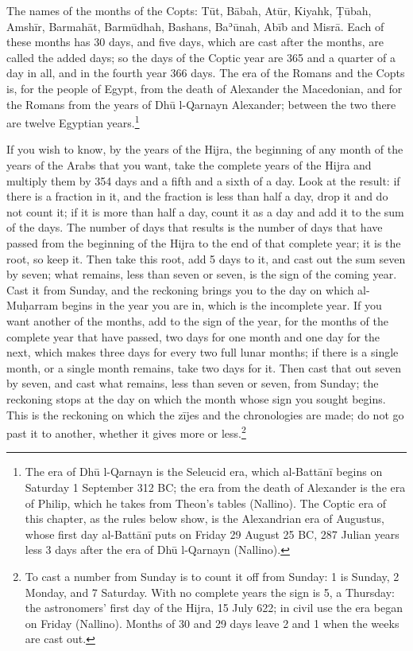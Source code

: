 \documentclass[11pt]{article}
\begin{document}
\par The names of the months of the Copts: Tūt, Bābah, Atūr, Kiyahk, Ṭūbah, Amshīr, Barmahāt, Barmūdhah, Bashans, Baʾūnah, Abīb and Misrā. Each of these months has 30 days, and five days, which are cast after the months, are called the added days; so the days of the Coptic year are 365 and a quarter of a day in all, and in the fourth year 366 days. The era of the Romans and the Copts is, for the people of Egypt, from the death of Alexander the Macedonian, and for the Romans from the years of Dhū l-Qarnayn Alexander; between the two there are twelve Egyptian years.\footnote{The era of Dhū l-Qarnayn is the Seleucid era, which al-Battānī begins on Saturday 1 September 312 BC; the era from the death of Alexander is the era of Philip, which he takes from Theon's tables (Nallino). The Coptic era of this chapter, as the rules below show, is the Alexandrian era of Augustus, whose first day al-Battānī puts on Friday 29 August 25 BC, 287 Julian years less 3 days after the era of Dhū l-Qarnayn (Nallino).}\par
\par If you wish to know, by the years of the Hijra, the beginning of any month of the years of the Arabs that you want, take the complete years of the Hijra and multiply them by 354 days and a fifth and a sixth of a day. Look at the result: if there is a fraction in it, and the fraction is less than half a day, drop it and do not count it; if it is more than half a day, count it as a day and add it to the sum of the days. The number of days that results is the number of days that have passed from the beginning of the Hijra to the end of that complete year; it is the root, so keep it. Then take this root, add 5 days to it, and cast out the sum seven by seven; what remains, less than seven or seven, is the sign of the coming year. Cast it from Sunday, and the reckoning brings you to the day on which al-Muḥarram begins in the year you are in, which is the incomplete year. If you want another of the months, add to the sign of the year, for the months of the complete year that have passed, two days for one month and one day for the next, which makes three days for every two full lunar months; if there is a single month, or a single month remains, take two days for it. Then cast that out seven by seven, and cast what remains, less than seven or seven, from Sunday; the reckoning stops at the day on which the month whose sign you sought begins. This is the reckoning on which the zījes and the chronologies are made; do not go past it to another, whether it gives more or less.\footnote{To cast a number from Sunday is to count it off from Sunday: 1 is Sunday, 2 Monday, and 7 Saturday. With no complete years the sign is 5, a Thursday: the astronomers' first day of the Hijra, 15 July 622; in civil use the era began on Friday (Nallino). Months of 30 and 29 days leave 2 and 1 when the weeks are cast out.}\par
\end{document}
